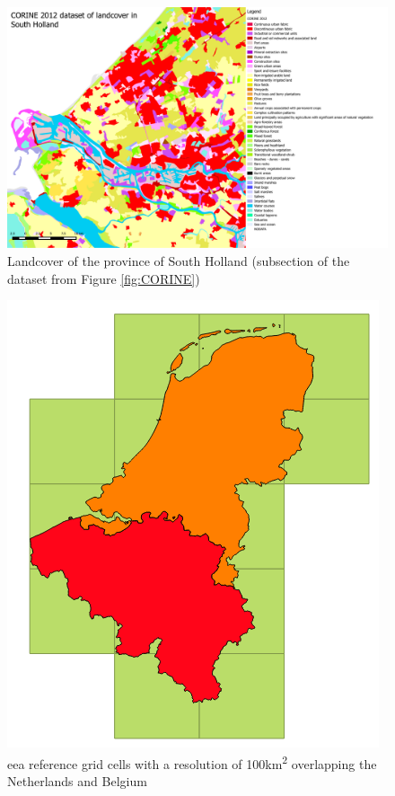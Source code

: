 \begin{figure}[!h]
	\centering
	\includegraphics[width=1\linewidth]{figs/CORINE_NL_BE_color_zoom.PDF}
	\caption{Landcover of the province of South Holland (subsection of the dataset from Figure \ref{fig:CORINE})}
	\label{fig:CORINEZOOM}
\end{figure}

\begin{figure}[!h]
	\centering
	\includegraphics[width=0.7\linewidth]{figs/EEA100km.png}
	\caption{\ac{eea} reference grid cells with a resolution of 100km\textsuperscript{2} overlapping the Netherlands and Belgium}
	\label{fig:100KM}
\end{figure}

